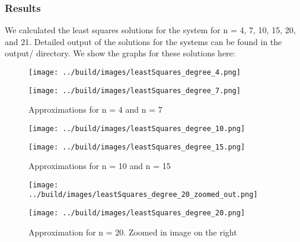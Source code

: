 \documentclass[11pt, a4paper, titlepage, openright]{article}
\begin{document}
\subsubsection{Results}
    We calculated the least squares solutions for the system for n = 4, 7, 10, 15, 20, and 21. Detailed output of the solutions for the systems can be found in the output/ directory.
    We show the graphs for these solutions here:
    \begin{figure}[H]
        \begin{minipage}[b]{0.49\textwidth}
            \texttt{[image: ../build/images/leastSquares\_degree\_4.png]}
        \end{minipage}
        \hfill
        \begin{minipage}[b]{0.49\textwidth}
            \texttt{[image: ../build/images/leastSquares\_degree\_7.png]}
        \end{minipage}
        \caption{Approximations for n = 4 and n = 7}
        \label{fig:results1}
    \end{figure}
    \begin{figure}[H]
        \begin{minipage}[b]{0.49\textwidth}
            \texttt{[image: ../build/images/leastSquares\_degree\_10.png]}
        \end{minipage}
        \hfill
        \begin{minipage}[b]{0.49\textwidth}
            \texttt{[image: ../build/images/leastSquares\_degree\_15.png]}
        \end{minipage}
       \caption{Approximations for n = 10 and n = 15}
        \label{fig:results2}
    \end{figure}
    \begin{figure}[H]
        \begin{minipage}[b]{0.49\textwidth}
            \texttt{[image: ../build/images/leastSquares\_degree\_20\_zoomed\_out.png]}
        \end{minipage}
        \hfill
        \begin{minipage}[b]{0.49\textwidth}
            \texttt{[image: ../build/images/leastSquares\_degree\_20.png]}
        \end{minipage}
        \caption{Approximation for n = 20. Zoomed in image on the right}
        \label{fig:results3}
    \end{figure}
\end{document}
